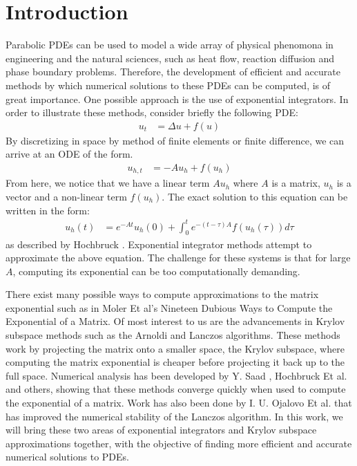 \section{Introduction}

Parabolic PDEs can be used to model a wide array of physical phenomona in engineering and the natural sciences, such as heat flow, reaction diffusion and phase boundary problems.
Therefore, the development of efficient and accurate methods by which numerical solutions to these PDEs can be computed, is of great importance.
One possible approach is the use of exponential integrators.
In order to illustrate these methods, consider briefly the following PDE:
\begin{align*}
    u_t &= \Delta u + f(u)
\end{align*}
By discretizing in space by method of finite elements or finite difference, we can arrive at an ODE of the form.
\begin{align*}
    u_{h,t} &= -Au_h + f(u_h)
\end{align*}
From here, we notice that we have a linear term $Au_h$ where $A$ is a matrix, $u_h$ is a vector and a non-linear term $f(u_h)$.
The exact solution to this equation can be written in the form:
\begin{align*}
    u_h(t) &= e^{-At}u_{h}(0) + \int^t_0 e^{-(t-\tau)A}f(u_{h}(\tau))d\tau
\end{align*}
as described by Hochbruck \cite{Hochbruck2010}.
Exponential integrator methods attempt to approximate the above equation.
The challenge for these systems is that for large $A$, computing its exponential can be too computationally demanding.

There exist many possible ways to compute approximations to the matrix exponential such as in Moler Et al's Nineteen Dubious Ways to Compute the Exponential of a Matrix\cite{Moler2003}.
Of most interest to us are the advancements in Krylov subspace methods such as the Arnoldi and Lanczos algorithms\cite{OJALVO1970}.
These methods work by projecting the matrix onto a smaller space, the Krylov subspace, where computing the matrix exponential is cheaper before projecting it back up to the full space.
Numerical analysis has been developed by Y. Saad \cite{Saad1992}, Hochbruck Et al.\cite{MarlisHochbruck1997} and others, showing that these methods converge quickly when used to compute the exponential of a matrix.
Work has also been done by I. U. Ojalovo Et al. \cite{OJALVO1970} that has improved the numerical stability of the Lanczos algorithm.
In this work, we will bring these two areas of exponential integrators and Krylov subspace approximations together, with the objective of finding more efficient and accurate numerical solutions to PDEs.


